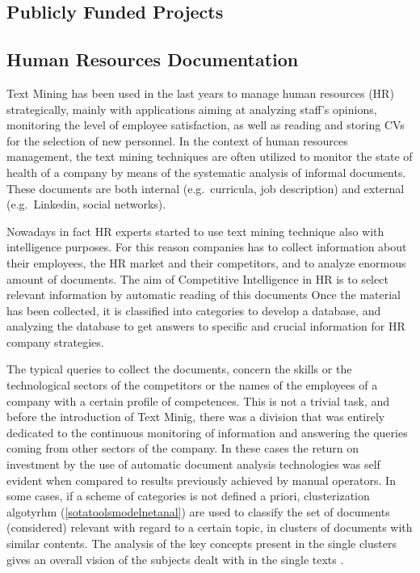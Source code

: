 \documentclass[]{book}
\begin{document}
\subsection{Publicly Funded Projects}\label{sotadocumentsprojects}

\subsection{Human Resources Documentation}\label{sotadocumentsjobs}

Text Mining has been used in the last years to manage human resources
(HR) strategically, mainly with applications aiming at analyzing staff's
opinions, monitoring the level of employee satisfaction, as well as
reading and storing CVs for the selection of new personnel. In the
context of human resources management, the text mining techniques are
often utilized to monitor the state of health of a company by means of
the systematic analysis of informal documents. These documents are both
internal (e.g.~curricula, job description) and external (e.g.~Linkedin,
social networks).

Nowadays in fact HR experts started to use text mining technique also
with intelligence purposes. For this reason companies has to collect
information about their employees, the HR market and their competitors,
and to analyze enormous amount of documents. The aim of Competitive
Intelligence in HR \citep{bolasco2005understanding} is to select
relevant information by automatic reading of this documents Once the
material has been collected, it is classified into categories to develop
a database, and analyzing the database to get answers to specific and
crucial information for HR company strategies.

The typical queries to collect the documents, concern the skills or the
technological sectors of the competitors or the names of the employees
of a company with a certain profile of competences. This is not a
trivial task, and before the introduction of Text Minig, there was a
division that was entirely dedicated to the continuous monitoring of
information and answering the queries coming from other sectors of the
company. In these cases the return on investment by the use of automatic
document analysis technologies was self evident when compared to results
previously achieved by manual operators. In some cases, if a scheme of
categories is not defined a priori, clusterization algotyrhm
(\ref{sotatoolsmodelnetanal}) are used to classify the set of documents
(considered) relevant with regard to a certain topic, in clusters of
documents with similar contents. The analysis of the key concepts
present in the single clusters gives an overall vision of the subjects
dealt with in the single texts \citep{gupta2009survey}.
\end{document}
